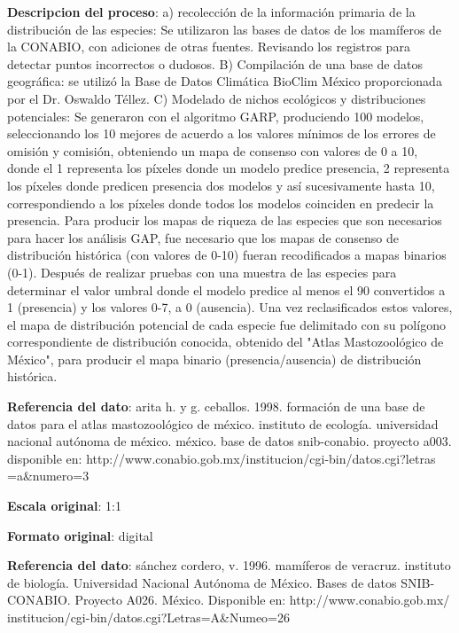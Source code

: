 \documentclass[twoside]{book}
\begin{document}
{\textbf{Descripcion del proceso}: a) recolección de la información primaria de la distribución de las
especies: Se utilizaron las bases de datos de los mamíferos de la CONABIO, con adiciones de otras fuentes. Revisando los registros para detectar puntos incorrectos o dudosos. B) Compilación de una
base de datos geográfica: se utilizó la Base de Datos Climática BioClim México proporcionada por el Dr. Oswaldo Téllez. C) Modelado de nichos ecológicos y distribuciones potenciales: Se generaron con el algoritmo GARP, produciendo 100 modelos, seleccionando los 10 mejores de acuerdo a los valores mínimos de los errores de omisión y comisión, obteniendo un mapa de consenso con valores de 0 a 10, donde el 1 representa los píxeles donde un modelo predice presencia, 2 representa los píxeles donde
predicen presencia dos modelos y así sucesivamente hasta 10, correspondiendo a los píxeles donde todos los modelos coinciden en predecir la presencia. Para producir los mapas de riqueza de las
especies que son necesarios para hacer los análisis GAP, fue necesario que los mapas de consenso de distribución histórica (con valores de 0-10) fueran recodificados a mapas binarios (0-1). Después de realizar pruebas con una muestra de las especies para determinar el valor umbral donde el modelo predice al menos el 90%
convertidos a 1 (presencia) y los valores 0-7, a 0 (ausencia). Una vez reclasificados estos valores, el mapa de distribución potencial de cada especie fue delimitado con su polígono correspondiente de
distribución conocida, obtenido del "Atlas Mastozoológico de México", para producir el mapa binario (presencia/ausencia) de distribución histórica.

\textbf{Referencia del dato}: arita h. y g. ceballos. 1998. formación de una base de datos para el atlas mastozoológico de méxico. instituto de ecología. universidad nacional autónoma de méxico. méxico. base de datos snib-conabio. proyecto a003. disponible en: http://www.conabio.gob.mx/institucion/cgi-bin/datos.cgi?letras\\=a\&numero=3

\textbf{Escala original}: 1:1

\textbf{Formato original}: digital

\textbf{Referencia del dato}: sánchez cordero, v. 1996. mamíferos de veracruz. instituto de biología. Universidad Nacional Autónoma de México. Bases de datos SNIB-CONABIO. Proyecto A026. México. Disponible en: http://www.conabio.gob.mx/\\institucion/cgi-bin/datos.cgi?Letras=A\&Numeo=26

}
\end{document}
